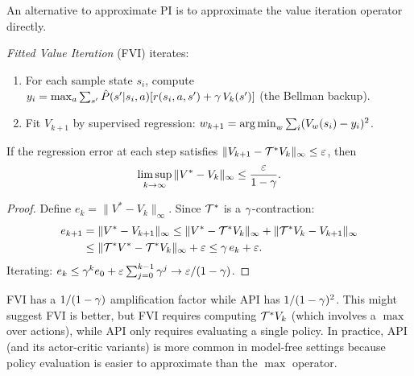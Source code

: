 \documentclass[11pt,a4paper]{article}
\begin{document}
An alternative to approximate PI is to approximate the value
iteration operator directly.

\begin{definition}
\label{def:fvi}
\emph{Fitted Value Iteration} (FVI) iterates:
\begin{enumerate}
  \item For each sample state $s_i$, compute
    $y_i = \max_a \sum_{s'} \hat{P}(s'|s_i, a)
    [r(s_i,a,s') + \gamma\,V_k(s')]$ (the Bellman backup).
  \item Fit $V_{k+1}$ by supervised regression:
    $w_{k+1} = \operatorname{arg\,min}_w \sum_i (V_w(s_i) - y_i)^2$.
\end{enumerate}
\end{definition}

\begin{proposition}
\label{prop:fvi}
If the regression error at each step satisfies
$\|V_{k+1} - \mathcal{T}^* V_k\|_\infty \leq \varepsilon$, then
\begin{equation}
  \limsup_{k \to \infty} \|V^* - V_k\|_\infty
  \leq \frac{\varepsilon}{1-\gamma}.
  \label{eq:fvi_bound}
\end{equation}
\end{proposition}

\begin{proof}
Define $e_k = \|V^* - V_k\|_\infty$. Since $\mathcal{T}^*$ is a
$\gamma$-contraction:
\begin{align}
  e_{k+1}
  &= \|V^* - V_{k+1}\|_\infty
  \leq \|V^* - \mathcal{T}^* V_k\|_\infty
  + \|\mathcal{T}^* V_k - V_{k+1}\|_\infty \nonumber\\
  &\leq \|\mathcal{T}^* V^* - \mathcal{T}^* V_k\|_\infty + \varepsilon
  \leq \gamma\, e_k + \varepsilon.
\end{align}
Iterating: $e_k \leq \gamma^k e_0 + \varepsilon
\sum_{j=0}^{k-1} \gamma^j \to \varepsilon/(1-\gamma)$.
\end{proof}

\begin{remark}
\label{rem:fvi_vs_api}
FVI has a $1/(1-\gamma)$ amplification factor while API has
$1/(1-\gamma)^2$. This might suggest FVI is better, but FVI
requires computing $\mathcal{T}^* V_k$ (which involves a $\max$ over
actions), while API only requires evaluating a single policy.
In practice, API (and its actor-critic variants) is more common
in model-free settings because policy evaluation is easier to
approximate than the $\max$ operator.
\end{remark}
\end{document}
